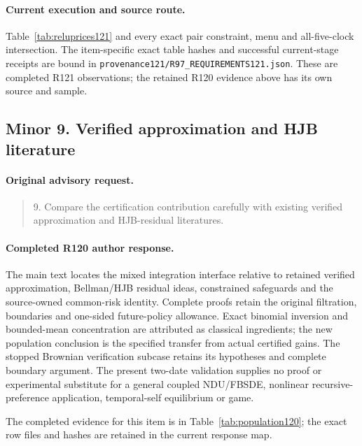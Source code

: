 \paragraph{Current execution and source route.}
Table~\ref{tab:reluprices121} and every exact pair constraint, menu and all-five-clock intersection.
The item-specific exact table hashes and successful current-stage receipts are bound in \nolinkurl{provenance121/R97_REQUIREMENTS121.json}. These are completed R121 observations; the retained R120 evidence above has its own source and sample.

\subsection{Minor 9. Verified approximation and HJB literature}
\label{response121:minor-9}

\paragraph{Original advisory request.}
\begin{quote}
9. Compare the certification contribution carefully with existing verified approximation and HJB-residual literatures.
\end{quote}

\paragraph{Completed R120 author response.}
The main text locates the mixed integration interface relative to retained verified approximation, Bellman/HJB residual ideas, constrained safeguards and the source-owned common-risk identity. Complete proofs retain the original filtration, boundaries and one-sided future-policy allowance. Exact binomial inversion and bounded-mean concentration are attributed as classical ingredients; the new population conclusion is the specified transfer from actual certified gains. The stopped Brownian verification subcase retains its hypotheses and complete boundary argument. The present two-date validation supplies no proof or experimental substitute for a general coupled NDU/FBSDE, nonlinear recursive-preference application, temporal-self equilibrium or game.

The completed evidence for this item is in Table~\ref{tab:population120}; the exact row files and hashes are retained in the current response map.

